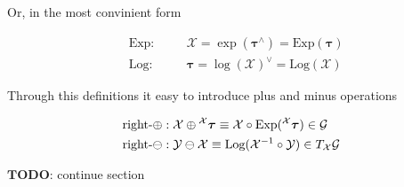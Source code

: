 Or, in the most convinient form

\begin{equation}
    \begin{aligned}
        \label{eqn:big_exp_log_for_r_m}
        & \text{Exp} : \quad && \mathcal{X} 
        = \exp(\boldsymbol{\tau}^\wedge) 
        = \text{Exp}(\boldsymbol{\tau})\\
        & \text{Log} : \quad && \boldsymbol{\tau} 
        = \log(\mathcal{X})^\vee
        = \text{Log}(\mathcal{X})
    \end{aligned}
\end{equation}

Through this definitions it easy to introduce plus and minus operations

\begin{equation}
    \begin{aligned}
        & \text{right-} \oplus: 
        \mathcal{X} \oplus \prescript{\mathcal{X}}{}{\boldsymbol{\tau}} 
        \equiv \mathcal{X} \circ 
        \text{Exp}(\prescript{\mathcal{X}}{}{\boldsymbol{\tau}}) \in \mathcal{G} \\
        & \text{right-} \ominus:
        \mathcal{Y} \ominus \mathcal{X} 
        \equiv \text{Log}(\mathcal{X}^{-1} \circ \mathcal{Y}) 
        \in T_{\mathcal{X}}\mathcal{G}
    \end{aligned}
\end{equation}

$\mathbf{TODO}$: continue section
